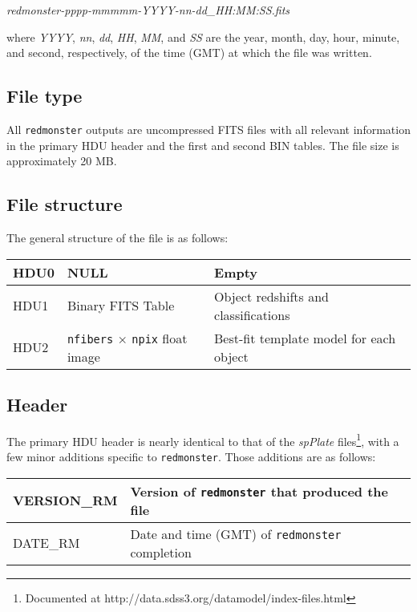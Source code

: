 \documentclass[12pt]{article}
\begin{document}
\begin{center}
	\textit{redmonster-pppp-mmmmm-YYYY-nn-dd\_HH:MM:SS.fits}
\end{center}

where \textit{YYYY}, \textit{nn}, \textit{dd}, \textit{HH}, \textit{MM}, and \textit{SS}
are the year, month, day, hour, minute, and second, respectively, of the time (GMT) at which
the file was written.

\subsection{File type}

All \texttt{redmonster} outputs are uncompressed FITS
files with all relevant information in the primary HDU header and the first and second
BIN tables.  The file size is approximately 20 MB.

\subsection{File structure}

The general structure of the file is as follows:

\begin{center}
	\begin{tabular}{ | l | l | l |}
	\hline
	HDU0 & NULL & Empty \\ \hline
	HDU1 & Binary FITS Table & Object redshifts and classifications \\ \hline
	HDU2 & \texttt{nfibers} $\times$ \texttt{npix} float image & Best-fit template model for each object \\
	\hline
	\end{tabular}
\end{center}

\subsection{Header}

The primary HDU header is nearly identical to that of the \textit{spPlate}
files\footnote{Documented at http://data.sdss3.org/datamodel/index-files.html}, with a few minor additions specific to \texttt{redmonster}.  Those
additions are as follows:

\begin{center}
	\begin{tabular}{ | l | l | }
	\hline
	VERSION\_RM & Version of \texttt{redmonster} that produced the file \\ \hline
	DATE\_RM & Date and time (GMT) of \texttt{redmonster} completion \\
	\hline
	\end{tabular}
\end{center}
\end{document}
